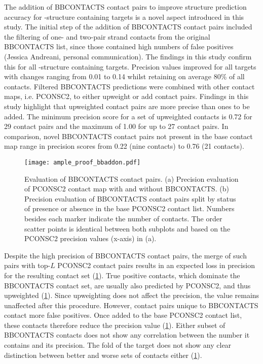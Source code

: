 The addition of BBCONTACTS contact pairs to improve structure prediction accuracy for \textbeta-structure containing targets is a novel aspect introduced in this study. The initial step of the addition of BBCONTACTS contact pairs included the filtering of one- and two-pair strand contacts from the original BBCONTACTS list, since those contained high numbers of false positives (Jessica Andreani, personal communication). The findings in this study confirm this for all \textbeta-structure containing targets. Precision values improved for all targets with changes ranging from 0.01 to 0.14 whilst retaining on average 80\% of all contacts. Filtered BBCONTACTS predictions were combined with other contact maps, i.e. PCONSC2, to either upweight or add contact pairs. Findings in this study highlight that upweighted contact pairs are more precise than ones to be added. The minimum precision score for a set of upweighted contacts is 0.72 for 29 contact pairs and the maximum of 1.00 for up to 27 contact pairs. In comparison, novel BBCONTACTS contact pairs not present in the base contact map range in precision scores from 0.22 (nine contacts) to 0.76 (21 contacts). 

\begin{figure}[H]
    \centering
    \texttt{[image: ample\_proof\_bbaddon.pdf]}
    \caption[Evaluation of BBCONTACTS contact pairs]{Evaluation of BBCONTACTS contact pairs. (a) Precision evaluation of PCONSC2 contact map with and without BBCONTACTS. (b) Precision evaluation of BBCONTACTS contact pairs split by status of presence or absence in the base PCONSC2 contact list. Numbers besides each marker indicate the number of contacts. The order scatter points is identical between both subplots and based on the PCONSC2 precision values (x-axis) in (a).}
    \label{fig:ample_proof_bbaddon}
\end{figure}

Despite the high precision of BBCONTACTS contact pairs, the merge of such pairs with top-$L$ PCONSC2 contact pairs results in an expected loss in precision for the resulting contact set (\cref{fig:ample_proof_bbaddon}). True positive contacts, which dominate the BBCONTACTS contact set, are usually also predicted by PCONSC2, and thus upweighted (\cref{fig:ample_proof_bbaddon}). Since upweighting does not affect the precision, the value remains unaffected after this procedure. However, contact pairs unique to BBCONTACTS contact more false positives. Once added to the base PCONSC2 contact list, these contacts therefore reduce the precision value (\cref{fig:ample_proof_bbaddon}). Either subset of BBCONTACTS contacts does not show any correlation between the number it contains and its precision. The fold of the target does not show any clear distinction between better and worse sets of contacts either (\cref{fig:ample_proof_bbaddon}).


